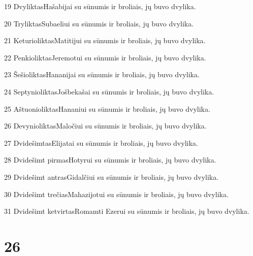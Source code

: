 \par 19 Dvyliktas­Hašabijai su sūnumis ir broliais, jų buvo dvylika. 
\par 20 Tryliktas­Subaeliui su sūnumis ir broliais, jų buvo dvylika. 
\par 21 Keturioliktas­Matitijui su sūnumis ir broliais, jų buvo dvylika. 
\par 22 Penkioliktas­Jeremotui su sūnumis ir broliais, jų buvo dvylika. 
\par 23 Šešioliktas­Hananijai su sūnumis ir broliais, jų buvo dvylika. 
\par 24 Septynioliktas­Jošbekašai su sūnumis ir broliais, jų buvo dvylika. 
\par 25 Aštuonioliktas­Hananiui su sūnumis ir broliais, jų buvo dvylika. 
\par 26 Devynioliktas­Maločiui su sūnumis ir broliais, jų buvo dvylika. 
\par 27 Dvidešimtas­Elijatai su sūnumis ir broliais, jų buvo dvylika. 
\par 28 Dvidešimt pirmas­Hotyrui su sūnumis ir broliais, jų buvo dvylika. 
\par 29 Dvidešimt antras­Gidalčiui su sūnumis ir broliais, jų buvo dvylika. 
\par 30 Dvidešimt trečias­Mahazijotui su sūnumis ir broliais, jų buvo dvylika. 
\par 31 Dvidešimt ketvirtas­Romamti Ezerui su sūnumis ir broliais, jų buvo dvylika.



\chapter{26}


